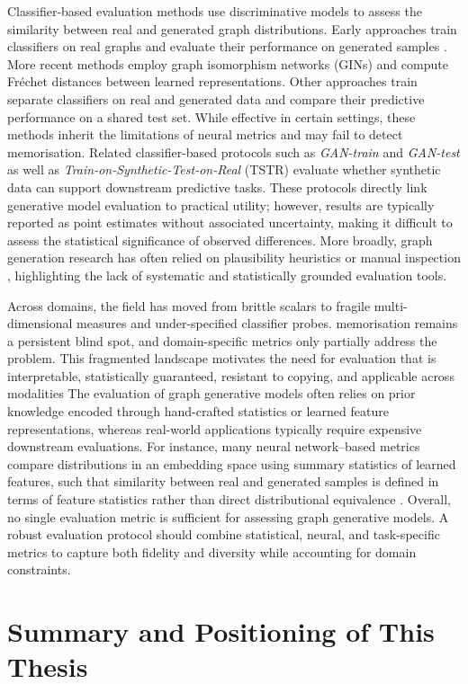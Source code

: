 Classifier-based evaluation methods use discriminative models to assess the similarity
between real and generated graph distributions. Early approaches train classifiers on
real graphs and evaluate their performance on generated samples
\citep{fan2019labelled,sun2019graph}. More recent methods employ graph isomorphism
networks (GINs) \citep{xu2019powerful} and compute Fréchet distances between learned
representations. Other approaches train separate classifiers on real and generated data
and compare their predictive performance on a shared test set.
While effective in certain settings, these methods inherit the limitations of neural
metrics and may fail to detect memorisation.
Related classifier-based protocols such as \emph{GAN-train} and \emph{GAN-test}
\citep{shmelkov2018good} as well as \emph{Train-on-Synthetic-Test-on-Real} (TSTR)
\citep{hyland2017real,yoon2019time} evaluate whether synthetic data can support
downstream predictive tasks. These protocols directly link generative model evaluation
to practical utility; however, results are typically reported as point estimates without
associated uncertainty, making it difficult to assess the statistical significance of
observed differences. More broadly, graph generation research has often relied on
plausibility heuristics or manual inspection \citep{you2018graphrnn}, highlighting the
lack of systematic and statistically grounded evaluation tools.


Across domains, the field has moved from
brittle scalars to fragile multi-dimensional measures and under-specified classifier probes.
memorisation remains a persistent blind spot, and domain-specific metrics only partially
address the problem. This fragmented landscape motivates the need for evaluation that is
interpretable, statistically guaranteed, resistant to copying, and applicable across modalities
The evaluation of graph generative models often relies on prior knowledge encoded
through hand-crafted statistics or learned feature representations, whereas real-world
applications typically require expensive downstream evaluations. For instance, many
neural network--based metrics compare distributions in an embedding space using
summary statistics of learned features, such that similarity between real and generated
samples is defined in terms of feature statistics rather than direct distributional
equivalence \citep{heusel2017gans}.
Overall, no single evaluation metric is sufficient for assessing graph generative models. A robust evaluation protocol should combine statistical, neural, and task-specific metrics to capture both fidelity and diversity while accounting for domain constraints.


\section{Summary and Positioning of This Thesis}
\label{sec:rw:summary}